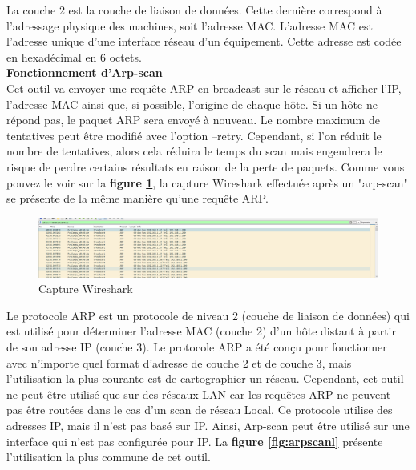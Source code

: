 La couche 2 est la couche de liaison de données. Cette dernière correspond à l’adressage physique des machines, soit l’adresse MAC. L’adresse MAC est l’adresse unique d’une interface réseau d’un équipement. Cette adresse est codée en hexadécimal en 6 octets.\\

\noindent \textbf{Fonctionnement d'Arp-scan}\\

Cet outil va envoyer une requête ARP en broadcast sur le réseau et afficher l’IP, l'adresse MAC ainsi que, si possible, l'origine de chaque hôte. Si un hôte ne répond pas, le paquet ARP sera envoyé à nouveau. Le nombre maximum de tentatives peut être modifié avec l'option --retry. Cependant, si l'on réduit le nombre de tentatives, alors cela réduira le temps du scan mais engendrera le risque de perdre certains résultats en raison de la perte de paquets.
Comme vous pouvez le voir sur la \textbf{figure \ref{fig:arpscanwireshark}}, la capture Wireshark effectuée après un "arp-scan" se présente de la même manière qu’une requête ARP.

\begin{figure}[htp!]
  \centering
  \setlength\figureheight{7cm}
  \setlength\figurewidth{9cm}
  \includegraphics[width=1\textwidth]{oui/images/Arpscan/wireshark.PNG}
  \caption{Capture Wireshark}
  \label{fig:arpscanwireshark}
\end{figure}

Le protocole ARP est un protocole de niveau 2 (couche de liaison de données) qui est utilisé pour déterminer l'adresse MAC (couche 2) d'un hôte distant à partir de son adresse IP (couche 3). Le protocole ARP a été conçu pour fonctionner avec n'importe quel format d'adresse de couche 2 et de couche 3, mais l'utilisation la plus courante est de cartographier un réseau.
Cependant, cet outil ne peut être utilisé que sur des réseaux LAN car les requêtes ARP ne peuvent pas être routées dans le cas d’un scan de réseau Local.
Ce protocole utilise des adresses IP, mais il n'est pas basé sur IP. Ainsi, Arp-scan peut être utilisé sur une interface qui n'est pas configurée pour IP. La \textbf{figure \ref{fig:arpscanl}} présente l'utilisation la plus commune de cet outil.

